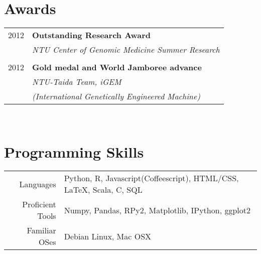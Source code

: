 \documentclass[10pt, a4paper]{article} %
\begin{document}
{\begin{minipage}[t]{0.44\textwidth}
\begin{tabular}{rl}
\end{tabular}\\[10pt]


\section{Awards}

\begin{tabular}{rl}
\textsc{2012} & \textbf{Outstanding Research Award}\\
    & \textit{NTU Center of Genomic Medicine Summer Research}\\

& \\

\textsc{2012} & \textbf{Gold medal and World Jamboree advance}\\
     & \textit{NTU-Taida Team, iGEM} \\
     & \textit{(International Genetically Engineered Machine)}
\end{tabular}\\[10pt]



\section{Programming Skills}

\begin{tabular}{rp{5cm}}
Languages
& Python, R, Javascript(Coffeescript), HTML/CSS, \LaTeX, Scala, C, SQL \\[0.5em]
Proficient Tools
& Numpy, Pandas, RPy2, Matplotlib, IPython, ggplot2 \\[0.5em]
Familiar OSes
& Debian Linux, Mac OSX \\[0.5em]
\end{tabular}\\[10pt]




\end{minipage}}
\end{document}
